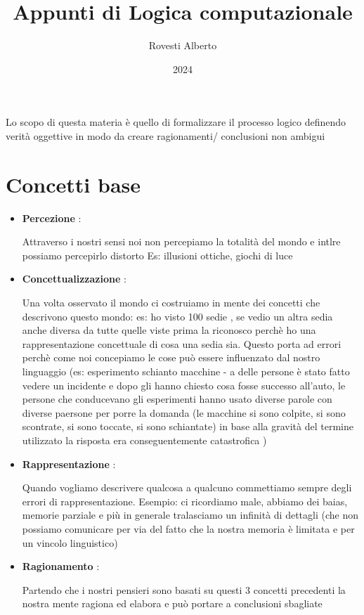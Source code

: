 \documentclass [12pt, letterpaper]{article}
\begin{document}
	\title{Appunti di Logica computazionale}
	\author{Rovesti Alberto}
	\date{2024}
	
	\maketitle
	
	Lo scopo di questa materia è quello di formalizzare il processo logico definendo verità oggettive in modo da creare ragionamenti/ conclusioni non ambigui
	
	
	
	\section{Concetti base}
	\begin{itemize}
		\item \textbf{Percezione} :
		
		Attraverso i nostri sensi noi non percepiamo la totalità del mondo e intlre possiamo percepirlo distorto Es: illusioni ottiche, giochi di luce 
		
		\item \textbf{Concettualizzazione} :
		
		Una volta osservato il mondo ci costruiamo in mente dei concetti che descrivono questo mondo: es:
		ho visto 100 sedie , se vedio un altra sedia anche diversa da tutte quelle viste prima la riconosco perchè ho una rappresentazione concettuale di cosa una sedia sia. Questo porta ad errori perchè come noi concepiamo le cose può essere influenzato dal nostro linguaggio (es: esperimento schianto macchine - a delle persone è stato fatto vedere un incidente e dopo gli hanno chiesto cosa fosse successo all'auto, le persone che conducevano gli esperimenti hanno usato diverse parole con diverse paersone per porre la domanda (le macchine si sono colpite, si sono scontrate, si sono toccate, si sono schiantate) in base alla gravità del termine utilizzato la risposta era conseguentemente catastrofica )
		
		\item \textbf{Rappresentazione} :
		
		Quando vogliamo descrivere qualcosa a qualcuno commettiamo sempre degli errori di rappresentazione. 
		Esempio: ci ricordiamo male, abbiamo dei baias, memorie parziale e più in generale tralasciamo un infinità di dettagli (che non possiamo comunicare per via del fatto che la nostra memoria è limitata e per un vincolo linguistico)
		
		\item \textbf{Ragionamento} :
		
		Partendo che i nostri pensieri sono basati su questi 3 concetti precedenti la nostra mente ragiona ed elabora e può portare a conclusioni sbagliate 
		
	\end{itemize}
	
\end{document}
